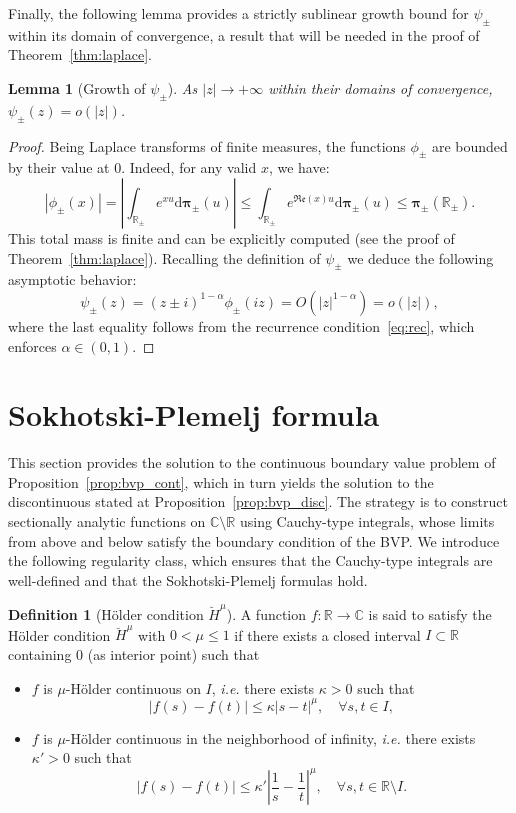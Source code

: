 \documentclass{article}
\theoremstyle{plain}
\newtheorem{lemma}[theorem]{Lemma}
\theoremstyle{definition}
\newtheorem{definition}[theorem]{Definition}
\theoremstyle{remark}
\begin{document}
Finally, the following lemma provides a strictly sublinear growth bound for $\psi_\pm$ within its domain of convergence, a result that will be needed in the proof of Theorem~\ref{thm:laplace}.

\begin{lemma}[Growth of $\psi_\pm$]\label{lemma:growth} As $|z|\to+\infty$ within their domains of convergence, $\psi_\pm(z)=o(|z|)$.
\end{lemma}

\begin{proof} Being Laplace transforms of finite measures, the functions $\phi_\pm$ are bounded by their value at $0$. Indeed, for any valid $x$, we have:
$$|\phi_\pm(x)|=\left|\int_{\mathbb R_\pm}e^{xu}\mathrm{d}\boldsymbol{\pi}_{\pm}(u)\right|\leqslant \int_{\mathbb R_\pm}e^{\mathfrak{Re}(x)u}\mathrm{d}\boldsymbol{\pi}_\pm(u)\leqslant \boldsymbol{\pi}_\pm \left(\mathbb R_\pm\right).$$
This total mass is finite and can be explicitly computed (see the proof of Theorem~\ref{thm:laplace}). Recalling the definition of $\psi_\pm$ we deduce the following asymptotic behavior:
$$\psi_{\pm}(z)=(z\pm i)^{1-\alpha}\phi_\pm(iz)=O(|z|^{1-\alpha})=o(|z|),$$
where the last equality follows from the recurrence condition~\eqref{eq:rec}, which enforces $\alpha\in (0,1)$.
\end{proof}

\section{Sokhotski-Plemelj formula}\label{sec:sp}

This section provides the solution to the continuous boundary value problem of Proposition~\ref{prop:bvp_cont}, which in turn yields the solution to the discontinuous stated at Proposition~\ref{prop:bvp_disc}. The strategy is to construct sectionally analytic functions on $\mathbb C\setminus\mathbb R$ using Cauchy-type integrals, whose limits from above and below satisfy the boundary condition of the BVP. We introduce the following regularity class, which ensures that the Cauchy-type integrals are well-defined and that the Sokhotski-Plemelj formulas hold.

\begin{definition}[Hölder condition $\breve{H}^\mu$]\label{def:holder} A function $f:\mathbb R\to\mathbb C$ is said to satisfy the Hölder condition $\breve{H}^\mu$ with $0<\mu\leqslant 1$ if there exists a closed interval $I\subset \mathbb R$ containing $0$ (as interior point) such that
\begin{itemize}
    \item[(i)] $f$ is $\mu$-Hölder continuous on $I$, \textit{i.e.} there exists $\kappa>0$ such that
    $$|f(s)-f(t)|\leqslant \kappa|s-t|^\mu,\quad \forall s,t\in I,$$
    \item[(ii)] $f$ is $\mu$-Hölder continuous in the neighborhood of infinity, \textit{i.e.} there exists $\kappa'>0$ such that
    $$|f(s)-f(t)|\leqslant \kappa'\left|\frac{1}{s}-\frac{1}{t}\right|^\mu,\quad \forall s,t\in\mathbb R\setminus I .$$
\end{itemize}
\end{definition}
\end{document}
